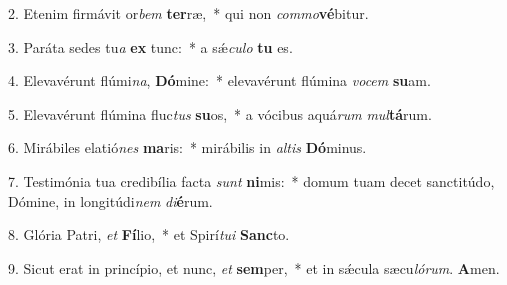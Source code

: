 2. Etenim firmávit or\textit{bem} \textbf{ter}ræ,~*  qui non \textit{com}\textit{mo}\textbf{vé}bitur.\

3. Paráta sedes tu\textit{a} \textbf{ex} tunc:~*  a sǽ\textit{cu}\textit{lo} \textbf{tu} es.\

4. Elevavérunt flúmi\textit{na}, \textbf{Dó}mine:~*  elevavérunt flúmina \textit{vo}\textit{cem} \textbf{su}am.\

5. Elevavérunt flúmina fluc\textit{tus} \textbf{su}os,~*  a vócibus aquá\textit{rum} \textit{mul}\textbf{tá}rum.\

6. Mirábiles elatió\textit{nes} \textbf{ma}ris:~*  mirábilis in \textit{al}\textit{tis} \textbf{Dó}minus.\

7. Testimónia tua credibília facta \textit{sunt} \textbf{ni}mis:~*  domum tuam decet sanctitúdo, Dómine, in longitúdi\textit{nem} \textit{di}\textbf{é}rum.\

8. Glória Patri, \textit{et} \textbf{Fí}lio,~*  et Spirí\textit{tu}\textit{i} \textbf{Sanc}to.\

9. Sicut erat in princípio, et nunc, \textit{et} \textbf{sem}per,~*  et in sǽcula sæcu\textit{ló}\textit{rum}. \textbf{A}men.\

